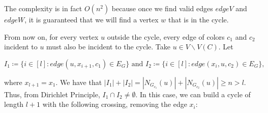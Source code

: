 The complexity is in fact $O(n^2)$ because once we find valid edges $edgeV$ and $edgeW$,
it is guaranteed that we will find a vertex $w$ that is in the cycle.

From now on, for every vertex $u$ outside the cycle, every edge of colors $c_1$ and $c_2$ incident to 
$u$ must also be incident to the cycle. 
Take $u \in V \backslash V(C)$. Let 

$$
I_1 \coloneqq \{i \in [l]: edge(u, x_{i + 1}, c_1) \in E_G\} \text{ and } I_2 \coloneqq \{i \in [l]: edge(x_i, u, c_2) \in E_G\},
$$

where $x_{l + 1} = x_1$. We have that $|I_1| + |I_2| = |N_{G_{c_1}}(u)| + |N_{G_{c_2}}(u)| \geq n > l$. Thus, 
from Dirichlet Principle, $I_1 \cap I_2 \neq \emptyset$. In this case, we can build a cycle of length $l + 1$
with the following crossing, removing the edge $x_i$:
